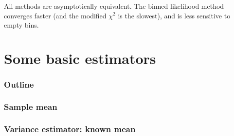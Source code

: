 \documentclass[9pt]{beamer}
\newif\ifmynote
\newcommand\mynote[1]{%
\ifmynote \textbf{#1} \else \fi
}
\begin{document}
\begin{frame}
 \frametitle{}
 
 All methods are asymptotically equivalent. The binned likelihood method converges faster (and the modified $\chi^2$ is the slowest), and is less sensitive to empty bins. 
\end{frame}

\section{Some basic estimators}


\begin{frame}
 \frametitle{Outline}
 
 \tableofcontents[current]
\end{frame}

\begin{frame}
 \frametitle{Sample mean}
 
 \mynote{Écrire d'abord au tableau}
 
\end{frame}

\begin{frame}
 \frametitle{Variance estimator: known mean}
 
 \mynote{Écrire d'abord au tableau}
 
\end{frame}
\end{document}
